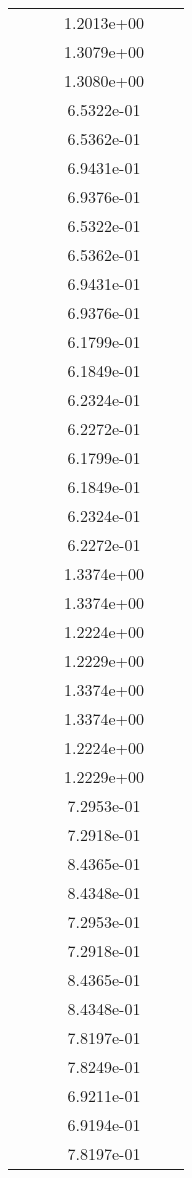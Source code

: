\begin{xltabular}{\textwidth}{r|rS[table-format=1.3e+2]S[table-format=1.4e+2]S[table-format=1.4e+2]S[table-format=-1.5]}
&  &  & 1.2013e+00 & & \\
&  &  & 1.3079e+00 & & \\
&  &  & 1.3080e+00 & & \\
&  &  & 6.5322e-01 & & \\
&  &  & 6.5362e-01 & & \\
&  &  & 6.9431e-01 & & \\
&  &  & 6.9376e-01 & & \\
&  &  & 6.5322e-01 & & \\
&  &  & 6.5362e-01 & & \\
&  &  & 6.9431e-01 & & \\
&  &  & 6.9376e-01 & & \\
&  &  & 6.1799e-01 & & \\
&  &  & 6.1849e-01 & & \\
&  &  & 6.2324e-01 & & \\
&  &  & 6.2272e-01 & & \\
&  &  & 6.1799e-01 & & \\
&  &  & 6.1849e-01 & & \\
&  &  & 6.2324e-01 & & \\
&  &  & 6.2272e-01 & & \\
&  &  & 1.3374e+00 & & \\
&  &  & 1.3374e+00 & & \\
&  &  & 1.2224e+00 & & \\
&  &  & 1.2229e+00 & & \\
&  &  & 1.3374e+00 & & \\
&  &  & 1.3374e+00 & & \\
&  &  & 1.2224e+00 & & \\
&  &  & 1.2229e+00 & & \\
&  &  & 7.2953e-01 & & \\
&  &  & 7.2918e-01 & & \\
&  &  & 8.4365e-01 & & \\
&  &  & 8.4348e-01 & & \\
&  &  & 7.2953e-01 & & \\
&  &  & 7.2918e-01 & & \\
&  &  & 8.4365e-01 & & \\
&  &  & 8.4348e-01 & & \\
&  &  & 7.8197e-01 & & \\
&  &  & 7.8249e-01 & & \\
&  &  & 6.9211e-01 & & \\
&  &  & 6.9194e-01 & & \\
&  &  & 7.8197e-01 & & \\

\end{xltabular}
